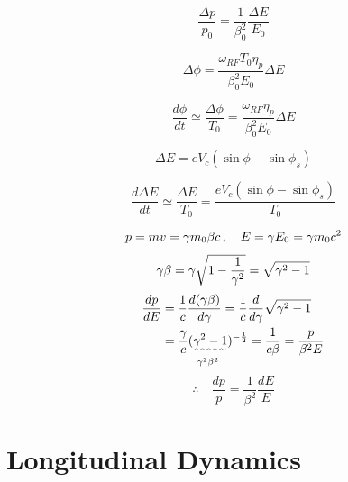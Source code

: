 \documentclass[10pt,a4paper]{ltjsarticle}
\begin{document}
\begin{equation}
    \frac{\Delta p}{p_0} = \frac{1}{\beta_0^2}\frac{\Delta E}{E_0}
    \label{delta_p}
\end{equation}

\begin{equation}
    \Delta \phi = \frac{\omega_{RF} T_0 \eta_p}{\beta_0^2 E_0}\Delta E
\end{equation}

\begin{equation}
    \frac{d\phi}{dt} \simeq \frac{\Delta\phi}{T_0} = \frac{\omega_{RF}\eta_p}{\beta_0^2 E_0}\Delta E
\end{equation}

\begin{equation}
    \Delta E = e V_c (\sin \phi - \sin \phi_s)
\end{equation}

\begin{equation}
    \frac{d\Delta E}{dt} \simeq \frac{\Delta E}{T_0}= \frac{e V_c (\sin\phi - \sin\phi_s)}{T_0}
\end{equation}

\begin{tcolorbox}[title=式 (\ref{delta_p}) の導出]
    
    \begin{align}
        p = mv = \gamma m_0 \beta c\,  , \quad E = \gamma E_0 = \gamma m_0 c^2 \notag
    \end{align}
    \begin{equation}
        \gamma \beta = \gamma \sqrt{1-\frac{1}{\gamma^2}} \notag = \sqrt{\gamma^2 -1} \notag
    \end{equation}
    \begin{align}
        \frac{dp}{dE} & = \frac{1}{c}\frac{d(\gamma \beta)}{d\gamma} = \frac{1}{c}\frac{d}{d\gamma}\sqrt{\gamma^2 -1} \notag \\
        & = \frac{\gamma}{c} \underset{\gamma^2\beta^2}{(\uwave{\gamma^2 -1}})^{-\frac{1}{2}} = \frac{1}{c\beta}
        = \frac{p}{\beta^2 E}\notag
    \end{align}
    \begin{equation}
        \therefore \quad \frac{dp}{p} = \frac{1}{\beta^2}\frac{dE}{E} \tag{C.1}
    \end{equation}
\end{tcolorbox}

%
\section{Longitudinal Dynamics}
\end{document}

